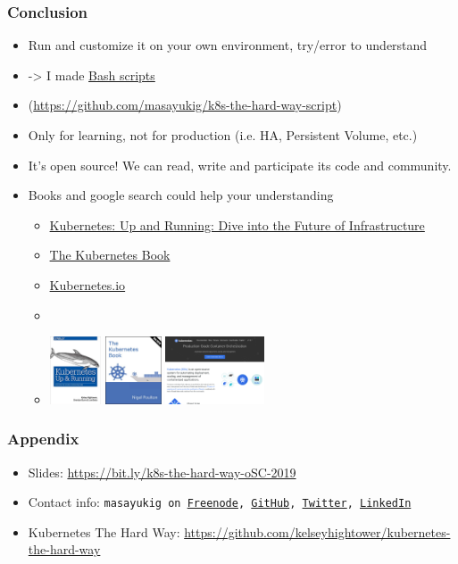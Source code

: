\documentclass[aspectratio=169,11pt,hyperref={colorlinks=true}]{beamer}
\begin{document}
\begin{frame}
  \frametitle{Conclusion}
  \begin{itemize}
    \item Run and customize it on your own environment, try/error to understand
    \item[] -> I made \href{https://github.com/masayukig/k8s-the-hard-way-script}{Bash scripts}
    \item[] (\url{https://github.com/masayukig/k8s-the-hard-way-script})
    \item Only for learning, not for production (i.e. HA, Persistent Volume, etc.)
    \item It's open source! We can read, write and participate its code and community.
    \item Books and google search could help your understanding
    \begin{itemize}
      \item \href{https://www.amazon.com/dp/B075G373MJ/}{Kubernetes: Up and Running: Dive into the Future of Infrastructure}
      \item
      \href{https://www.amazon.com/dp/B072TS9ZQZ/}{The Kubernetes Book}
      \item
      \href{https://kubernetes.io}{Kubernetes.io}
      \item[]
      \item[] \includegraphics[height=20mm]{images/kubernetes-up-and-running.png}
       \includegraphics[height=20mm]{images/the-kubernetes-book.png}
       \includegraphics[height=20mm]{images/kubernetes-io.png}
    \end{itemize}
  \end{itemize}
\end{frame}

\begin{frame}
  \frametitle{Appendix}
  \begin{itemize}
      \item Slides: \url{https://bit.ly/k8s-the-hard-way-oSC-2019}
      \item Contact info: \texttt{masayukig on
        \href{https://freenode.net/}{Freenode},
        \href{https://github.com/masayukig}{GitHub},
        \href{https://twitter.com/masayukig}{Twitter},
        \href{https://www.linkedin.com/in/masayukig/}{LinkedIn}}
      \item Kubernetes The Hard Way: \url{https://github.com/kelseyhightower/kubernetes-the-hard-way}
  \end{itemize}
\end{frame}
\end{document}
